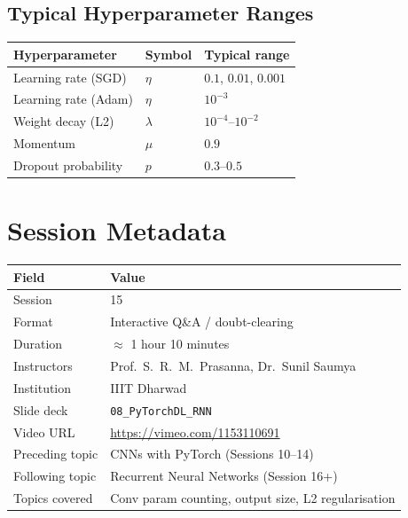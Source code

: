 \documentclass[12pt,a4paper]{article}
\begin{document}
\subsection*{Typical Hyperparameter Ranges}
\begin{center}
\begin{tabular}{@{}lll@{}}
  \toprule
  Hyperparameter & Symbol & Typical range \\
  \midrule
  Learning rate (SGD)      & $\eta$ & $0.1$, $0.01$, $0.001$ \\
  Learning rate (Adam)     & $\eta$ & $10^{-3}$ \\
  Weight decay (L2)        & $\lambda$ & $10^{-4}$--$10^{-2}$ \\
  Momentum                 & $\mu$ & $0.9$ \\
  Dropout probability      & $p$ & $0.3$--$0.5$ \\
  \bottomrule
\end{tabular}
\end{center}

\section{Session Metadata}
\label{app:metadata}

\begin{center}
\begin{tabular}{@{}ll@{}}
  \toprule
  Field & Value \\
  \midrule
  Session       & 15 \\
  Format        & Interactive Q\&A / doubt-clearing \\
  Duration      & $\approx$ 1 hour 10 minutes \\
  Instructors   & Prof.\ S.~R.~M.\ Prasanna, Dr.\ Sunil Saumya \\
  Institution   & IIIT Dharwad \\
  Slide deck    & \texttt{08\_PyTorchDL\_RNN} \\
  Video URL     & \url{https://vimeo.com/1153110691} \\
  Preceding topic & CNNs with PyTorch (Sessions 10--14) \\
  Following topic & Recurrent Neural Networks (Session 16+) \\
  Topics covered  & Conv param counting, output size, L2 regularisation \\
  \bottomrule
\end{tabular}
\end{center}
\end{document}
